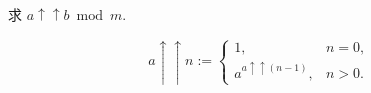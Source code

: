 求 \(a\uparrow\uparrow b\bmod m\).

\[
    a\uparrow\uparrow n:=\begin{cases}
        1,                           & n=0, \\
        a^{a\uparrow\uparrow (n-1)}, & n>0.
    \end{cases}
\]
